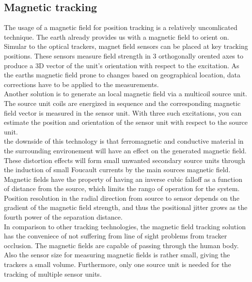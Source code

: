 \subsection{Magnetic tracking}
The usage of a magnetic field for position tracking is a relatively uncomlicated technique. The earth already provides us with a magnetic field to orient on. Simular to the optical trackers, magnet field sensors can be placed at key tracking positions. These sensors measure field strength in 3 orthogonally orented axes to produce a 3D vector of the unit’s orientation with respect to the excitation. As the earths magnetic field prone to changes based on geographical location, data corrections have to be applied to the measurements.\\Another solution is to generate an local magnetic field via a multicoil source unit. The source unit coils are energized in sequence and the corresponding magnetic field vector is measured in the sensor unit. With three such excitations, you can estimate the position and orientation of the sensor unit with respect to the source unit.\\the downside of this technology is that ferromagnetic and conductive material in the surrounding environement will have an effect on the generated magnetic field. These distortion effects will form small unwanted secondary source units through the induction of small Foucault currents by the main sources magnetic field.
Magnetic fields have the property of having an inverse cubic falloff  as a function of distance from the source, which limits the rango of operation for the system.
Position resolution in the radial direction from source to sensor depends on the gradient of the magnetic field strength, and thus the positional jitter grows as the fourth power of the separation distance.\\
In comparison to other tracking technologies, the magnetic field tracking solution has the conveniece of not suffering from line of sight problems from tracker occlusion. The magnetic fields are capable of passing through the human body. Also the sensor size for measuring magnetic fields is rather small, giving the trackers a small volume. Furthermore, only one source unit is needed for the tracking of multiple sensor units.
